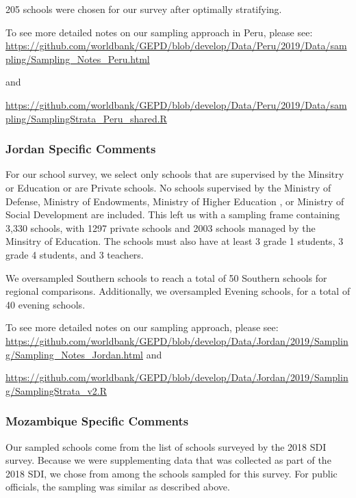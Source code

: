 \documentclass[]{article}
\begin{document}
205 schools were chosen for our survey after optimally stratifying.

To see more detailed notes on our sampling approach in Peru, please see:
\url{https://github.com/worldbank/GEPD/blob/develop/Data/Peru/2019/Data/sampling/Sampling_Notes_Peru.html}

and

\url{https://github.com/worldbank/GEPD/blob/develop/Data/Peru/2019/Data/sampling/SamplingStrata_Peru_shared.R}

\hypertarget{jordan-specific-comments}{%
\subsubsection{Jordan Specific
Comments}\label{jordan-specific-comments}}

For our school survey, we select only schools that are supervised by the
Minsitry or Education or are Private schools. No schools supervised by
the Ministry of Defense, Ministry of Endowments, Ministry of Higher
Education , or Ministry of Social Development are included. This left us
with a sampling frame containing 3,330 schools, with 1297 private
schools and 2003 schools managed by the Minsitry of Education. The
schools must also have at least 3 grade 1 students, 3 grade 4 students,
and 3 teachers.

We oversampled Southern schools to reach a total of 50 Southern schools
for regional comparisons. Additionally, we oversampled Evening schools,
for a total of 40 evening schools.

To see more detailed notes on our sampling approach, please see:
\url{https://github.com/worldbank/GEPD/blob/develop/Data/Jordan/2019/Sampling/Sampling_Notes_Jordan.html}
and

\url{https://github.com/worldbank/GEPD/blob/develop/Data/Jordan/2019/Sampling/SamplingStrata_v2.R}

\hypertarget{mozambique-specific-comments}{%
\subsubsection{Mozambique Specific
Comments}\label{mozambique-specific-comments}}

Our sampled schools come from the list of schools surveyed by the 2018
SDI survey. Because we were supplementing data that was collected as
part of the 2018 SDI, we chose from among the schools sampled for this
survey. For public officials, the sampling was similar as described
above.
\end{document}
